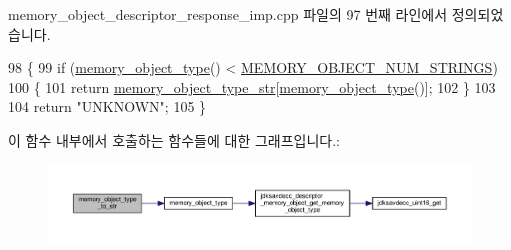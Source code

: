 memory\+\_\+object\+\_\+descriptor\+\_\+response\+\_\+imp.\+cpp 파일의 97 번째 라인에서 정의되었습니다.


\begin{DoxyCode}
98 \{
99     \textcolor{keywordflow}{if} (\hyperlink{classavdecc__lib_1_1memory__object__descriptor__response__imp_a4c7518806ae5115cfe8f20201078275d}{memory\_object\_type}() < \hyperlink{memory__object__descriptor__response__imp_8cpp_ae2c7466e67315d4c79a9b366edcc1644}{MEMORY\_OBJECT\_NUM\_STRINGS})
100     \{
101         \textcolor{keywordflow}{return} \hyperlink{namespaceavdecc__lib_a46dd51611fc0c91e9fa3943bf87024f7}{memory\_object\_type\_str}[\hyperlink{classavdecc__lib_1_1memory__object__descriptor__response__imp_a4c7518806ae5115cfe8f20201078275d}{memory\_object\_type}()];
102     \}
103 
104     \textcolor{keywordflow}{return} \textcolor{stringliteral}{"UNKNOWN"};
105 \}
\end{DoxyCode}


이 함수 내부에서 호출하는 함수들에 대한 그래프입니다.\+:
\nopagebreak
\begin{figure}[H]
\begin{center}
\leavevmode
\includegraphics[width=350pt]{classavdecc__lib_1_1memory__object__descriptor__response__imp_a91d74def02b04d7ce4dd7c1a4d8037f8_cgraph}
\end{center}
\end{figure}


